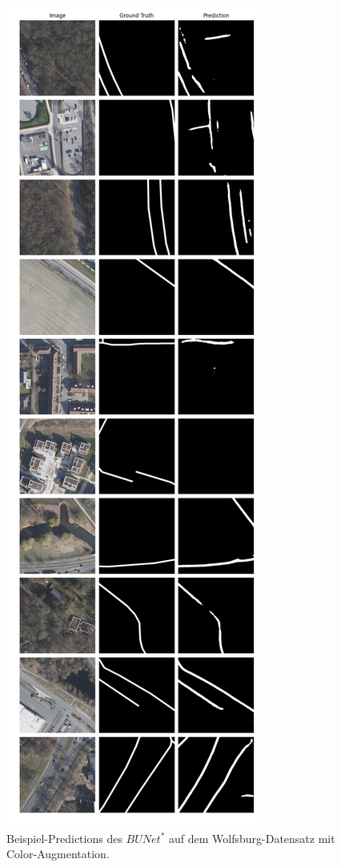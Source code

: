 \begin{figure}
	\centering
	\includegraphics[width=.41\textwidth]{Bilder/wolfsburg-color-samples/bunet15-s.png}
	\caption{Beispiel-Predictions des $BUNet^*$ auf dem Wolfsburg-Datensatz mit Color-Augmentation.}
	\label{fig:wolfsburg-color-samples-bunet15-s}
\end{figure}

